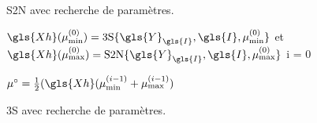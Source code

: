 \begin{normalalgorithme*}
\begin{minipage}{\textwidth}
\begin{algorithm}[H]
                \medskip
            \end{algorithm}
        \end{minipage}
        \caption{S2N avec recherche de paramètres.\protect\label{algo-S2N-avec-param}}
    \end{normalalgorithme*}

    \begin{normalalgorithme*}
        \begin{minipage}{\textwidth}
            \begin{algorithm}[H]
                
                \medskip

                $\gls{Xh}(\mu_{\mathrm{min}}^{(0)}) = \mathrm{3S}\{\gls{Y}_{\gls{I}}, \gls{I}, \mu_{\mathrm{min}}^{(0)}\}$ et 
                $\gls{Xh}(\mu_{\mathrm{max}}^{(0)}) = \mathrm{S2N}\{\gls{Y}_{\gls{I}}, \gls{I}, \mu_{\mathrm{max}}^{(0)}\}$\;
                i = 0\;

                $\mu^{\circ} = \frac{1}{2}(\gls{Xh}(\mu_{\mathrm{min}}^{(i-1)} + \mu_{\mathrm{max}}^{(i-1)})$

                \medskip
            \end{algorithm}
        \end{minipage}
        \caption{3S avec recherche de paramètres.\protect\label{algo-3S-avec-param}}
    \end{normalalgorithme*}
    